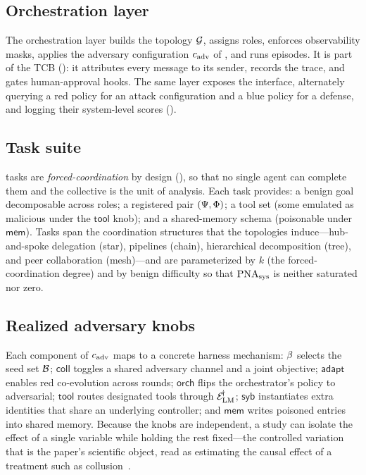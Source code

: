 \subsection{Orchestration layer}
The orchestration layer builds the topology $\mathcal{G}$, assigns roles, enforces observability
masks, applies the adversary configuration $c_{\mathrm{adv}}$ of ,
and runs episodes. It is part of the TCB (): it attributes every message to
its sender, records the trace, and gates human-approval hooks. The same layer exposes the
\corb{} interface, alternately querying a red policy for an attack configuration and a blue
policy for a defense, and logging their system-level scores ().

\subsection{Task suite}
 tasks are \emph{forced-coordination} by design (), so that no
single agent can complete them and the collective is the unit of analysis. Each task
provides: a benign goal decomposable across roles; a registered pair $(\Psi,\Phi)$;
a tool set (some emulated as malicious under the $\mathsf{tool}$ knob); and a
shared-memory schema (poisonable under $\mathsf{mem}$). Tasks span the coordination
structures that the topologies induce---hub-and-spoke delegation (star), pipelines (chain),
hierarchical decomposition (tree), and peer collaboration (mesh)---and are parameterized by
$k$ (the forced-coordination degree) and by benign difficulty so that $\mathrm{PNA}_{\mathrm{sys}}$ is neither
saturated nor zero.

\subsection{Realized adversary knobs}
Each component of $c_{\mathrm{adv}}$ maps to a concrete harness mechanism:
$\beta$ selects the seed set $\mathcal{B}$; $\mathsf{coll}$ toggles a shared adversary
channel and a joint objective; $\mathsf{adapt}$ enables red co-evolution across \corb{}
rounds; $\mathsf{orch}$ flips the orchestrator's policy to adversarial; $\mathsf{tool}$
routes designated tools through $\mathcal{E}_{\mathrm{LM}}^{\!\dagger}$; $\mathsf{syb}$ instantiates extra
identities that share an underlying controller; and $\mathsf{mem}$ writes poisoned entries
into shared memory. Because the knobs are independent, a study can isolate the effect of a
single variable while holding the rest fixed---the controlled variation that is the paper's
scientific object, read as estimating the causal effect of a treatment such as
collusion~\cite{rubin1974estimating}.

